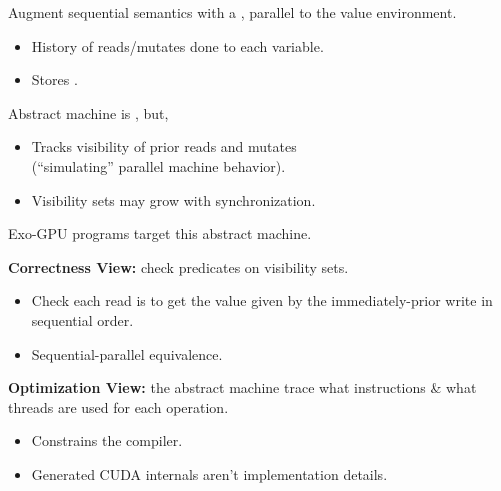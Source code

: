 {\LARGE

Augment sequential semantics with a , parallel to the value environment.
\begin{itemize}
  \item History of reads/mutates done to each variable.
  \item Stores .
\end{itemize}

\vspace{5mm}

Abstract machine is , but,
\begin{itemize}
  \item Tracks visibility of prior reads and mutates\\(``simulating'' parallel machine behavior).
  \item Visibility sets may grow with synchronization.
\end{itemize}

}


\newpage
{}

{\LARGE
Exo-GPU programs target this abstract machine.

\textbf{Correctness View:} check predicates on visibility sets.
\begin{itemize}
  \item Check each read is  to get the value given by the immediately-prior write in sequential order.
  \item Sequential-parallel equivalence.
\end{itemize}

\textbf{Optimization View:} the abstract machine trace  what instructions \& what threads are used for each operation.
\begin{itemize}
  \item Constrains the compiler.
  \item Generated CUDA internals aren't implementation details.
\end{itemize}

}










